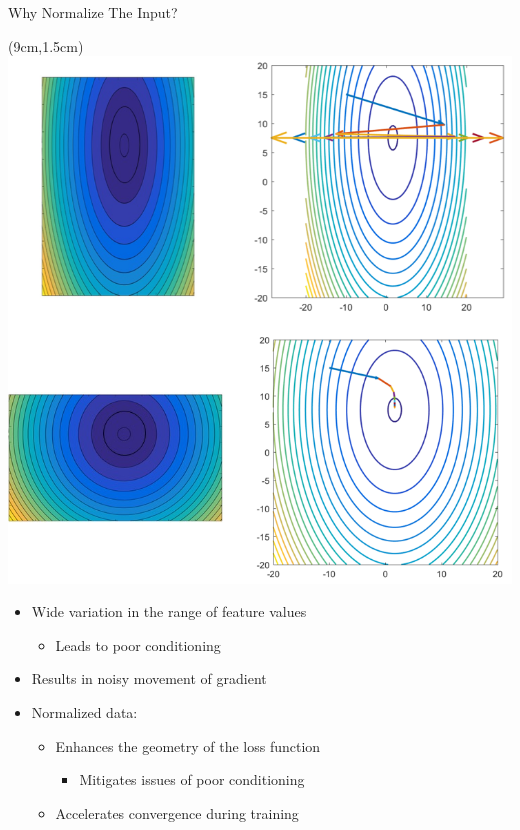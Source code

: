 \documentclass[serif, aspectratio=169]{beamer}
\begin{document}
\begin{frame}{Why Normalize The Input?}
	
	\begin{textblock*}{5cm}(9cm,1.5cm) %
		\includegraphics[keepaspectratio, scale=0.25]{pic/poorcond}
	\end{textblock*}
	
	\begin{itemize}
		\item Wide variation in the range of feature \newline values
		\begin{itemize}
			\item Leads to poor conditioning
		\end{itemize}
		\item Results in noisy movement of gradient
	\end{itemize}
	\vspace{1.5cm}
	\begin{itemize}
		\item Normalized data:
		\begin{itemize}
			\item Enhances the geometry of the loss \newline function
			\begin{itemize}
				\item Mitigates issues of poor conditioning
			\end{itemize}
			\item Accelerates convergence during training
		\end{itemize}
	\end{itemize}
\end{frame}
\end{document}
